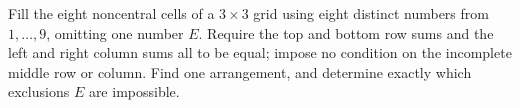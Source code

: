 Fill the eight noncentral cells of a $3\times3$ grid using eight distinct numbers from $1,\ldots,9$, omitting one number $E$. Require the top and bottom row sums and the left and right column sums all to be equal; impose no condition on the incomplete middle row or column. Find one arrangement, and determine exactly which exclusions $E$ are impossible.
